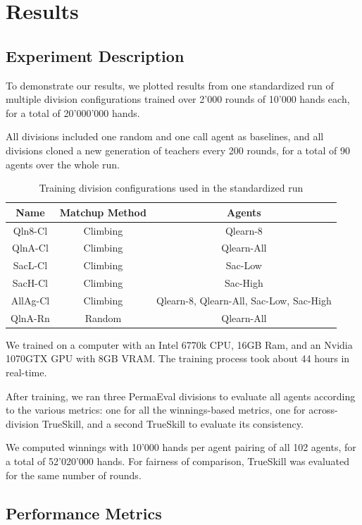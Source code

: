 \chapter{Results}

\section{Experiment Description}
To demonstrate our results, we plotted results from one standardized run of multiple division configurations trained over 2'000 rounds of 10'000 hands each, for a total of 20'000'000 hands.

All divisions included one random and one call agent as baselines, and all divisions cloned a new generation of teachers every 200 rounds, for a total of 90 agents over the whole run.

\begin{table}[h!]
\centering
\begin{tabular}{|| c | c | c ||} 
 \hline
 Name & Matchup Method & Agents \\ [0.5ex] 
 \hline\hline
 Qln8-Cl & Climbing & Qlearn-8 \\
 QlnA-Cl & Climbing & Qlearn-All \\
 SacL-Cl & Climbing & Sac-Low \\
 SacH-Cl & Climbing & Sac-High \\
 AllAg-Cl & Climbing & Qlearn-8, Qlearn-All, Sac-Low, Sac-High \\
 QlnA-Rn & Random & Qlearn-All \\ [1ex] 
 \hline
\end{tabular}
\caption{Training division configurations used in the standardized run}
\label{RunDivisions}
\end{table}

We trained on a computer with an Intel 6770k CPU, 16GB Ram, and an Nvidia 1070GTX GPU with 8GB VRAM. The training process took about 44 hours in real-time.

After training, we ran three PermaEval divisions to evaluate all agents according to the various metrics: one for all the winnings-based metrics, one for across-division TrueSkill, and a second TrueSkill to evaluate its consistency.

We computed winnings with 10'000 hands per agent pairing of all 102 agents, for a total of 52'020'000 hands. For fairness of comparison, TrueSkill was evaluated for the same number of rounds.

\section{Performance Metrics}

